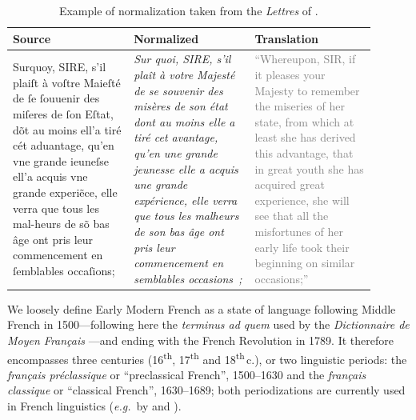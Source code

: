 \begin{table}[!htp]
    \centering\small
    \begin{tabular}{@{}p{0.3\linewidth}p{0.3\linewidth}p{0.3\linewidth}@{}}
        \toprule
        Source                                                                                                                                                                                                                                                                                               & Normalized & Translation \\
        \midrule
        Surquoy, SIRE, s’il plaiſt à voſtre Maieſté de ſe ſouuenir des miſeres de ſon Eſtat, dõt au moins ell’a tiré cét aduantage, qu’en vne grande ieuneſse ell’a acquis vne grande experi\~ece, elle verra que tous les mal-heurs de sõ bas âge ont pris leur commencement en ſemblables occaſions;       &
        \emph{Sur quoi, SIRE, s’il plaît à votre Majesté de se souvenir des misères de son état dont au moins elle a tiré cet avantage, qu’en une grande jeunesse elle a acquis une grande expérience, elle verra que tous les malheurs de son bas âge ont pris leur commencement en semblables occasions~;} &
        \textcolor{gray}{``Whereupon, SIR, if it pleases your Majesty to remember the miseries of her state, from which at least she has derived this advantage, that in great youth she has acquired great experience, she will see that all the misfortunes of her early life took their beginning on similar occasions;''}           \\
        \bottomrule
    \end{tabular}
    \caption{\label{tab:norm_examples}Example of normalization taken from the \emph{Lettres} of \protect\citet{balzac-1624-lettres}.}
\end{table}

We loosely define Early Modern French as a state of language following Middle French in 1500---following here the \emph{terminus ad quem} used by the \emph{Dictionnaire de Moyen Français} \citep{martin-2020-dictionnaire}---and ending with the French Revolution in 1789. It therefore encompasses three centuries (16\textsuperscript{th}, 17\textsuperscript{th} and 18\textsuperscript{th}\,c.), or two linguistic periods: the \emph{français préclassique} or ``preclassical French'', 1500--1630 and the \emph{français classique} or ``classical French'', 1630--1689; both periodizations are currently used in French linguistics (\emph{e.g.}~by \citet{vachon-2010-changement} and \citet{amatuzzi-etal-2019-ameliorer}).

